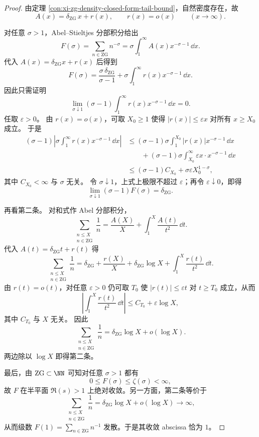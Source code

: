 \begin{proof}
由定理 \ref{con:xi-zg-density-closed-form-tail-bound}，自然密度存在，故
\[
A(x)=\delta_{\mathrm{ZG}}\,x+r(x),
\qquad
r(x)=o(x)
\qquad (x\to\infty).
\]

对任意 \(\sigma>1\)，Abel--Stieltjes 分部积分给出
\[
F(\sigma)
=
\sum_{n\in\mathrm{ZG}}n^{-\sigma}
=
\sigma\int_1^\infty A(x)x^{-\sigma-1}\,\dd x.
\]
代入 \(A(x)=\delta_{\mathrm{ZG}}x+r(x)\) 后得到
\[
F(\sigma)
=
\frac{\sigma\,\delta_{\mathrm{ZG}}}{\sigma-1}
+
\sigma\int_1^\infty r(x)x^{-\sigma-1}\,\dd x.
\]
因此只需证明
\[
\lim_{\sigma\downarrow1}
(\sigma-1)\int_1^\infty r(x)x^{-\sigma-1}\,\dd x=0.
\]
任取 \(\varepsilon>0\)。
由 \(r(x)=o(x)\)，可取 \(X_0\ge 1\) 使得 \(|r(x)|\le \varepsilon x\) 对所有 \(x\ge X_0\) 成立。
于是
\[
\begin{aligned}
(\sigma-1)\left|\sigma\int_1^\infty r(x)x^{-\sigma-1}\,\dd x\right|
&\le
(\sigma-1)\sigma\int_1^{X_0}|r(x)|x^{-\sigma-1}\,\dd x \\
&\qquad
+(\sigma-1)\sigma\int_{X_0}^{\infty}\varepsilon x\cdot x^{-\sigma-1}\,\dd x \\
&\le
(\sigma-1)C_{X_0}
+\sigma\varepsilon X_0^{1-\sigma},
\end{aligned}
\]
其中 \(C_{X_0}<\infty\) 与 \(\sigma\) 无关。
令 \(\sigma\downarrow1\)，上式上极限不超过 \(\varepsilon\)；再令 \(\varepsilon\downarrow0\)，即得
\[
\lim_{\sigma\downarrow 1}(\sigma-1)F(\sigma)=\delta_{\mathrm{ZG}}.
\]

再看第二条。
对和式作 Abel 分部积分，
\[
\sum_{\substack{n\le X\\ n\in\mathrm{ZG}}}\frac1n
=
\frac{A(X)}{X}+\int_1^X \frac{A(t)}{t^2}\,\dd t.
\]
代入 \(A(t)=\delta_{\mathrm{ZG}}t+r(t)\) 得
\[
\sum_{\substack{n\le X\\ n\in\mathrm{ZG}}}\frac1n
=
\delta_{\mathrm{ZG}}
+\frac{r(X)}{X}
+\delta_{\mathrm{ZG}}\log X
+\int_1^X \frac{r(t)}{t^2}\,\dd t.
\]
由 \(r(t)=o(t)\)，对任意 \(\varepsilon>0\) 仍可取 \(T_0\) 使 \(|r(t)|\le \varepsilon t\) 对 \(t\ge T_0\) 成立，从而
\[
\left|\int_1^X \frac{r(t)}{t^2}\,\dd t\right|
\le C_{T_0}+\varepsilon\log X,
\]
其中 \(C_{T_0}\) 与 \(X\) 无关。
因此
\[
\sum_{\substack{n\le X\\ n\in\mathrm{ZG}}}\frac1n
=
\delta_{\mathrm{ZG}}\log X+o(\log X).
\]
两边除以 \(\log X\) 即得第二条。

最后，由 \(\mathrm{ZG}\subset \NN\) 可知对任意 \(\sigma>1\) 都有
\[
0\le F(\sigma)\le \zeta(\sigma)<\infty,
\]
故 \(F\) 在半平面 \(\Re(s)>1\) 上绝对收敛。另一方面，第二条等价于
\[
\sum_{\substack{n\le X\\ n\in\mathrm{ZG}}}\frac1n
=
\delta_{\mathrm{ZG}}\log X+o(\log X)\to\infty,
\]
从而级数 \(F(1)=\sum_{n\in\mathrm{ZG}}n^{-1}\) 发散。于是其收敛 abscissa 恰为 \(1\)。
\end{proof}

